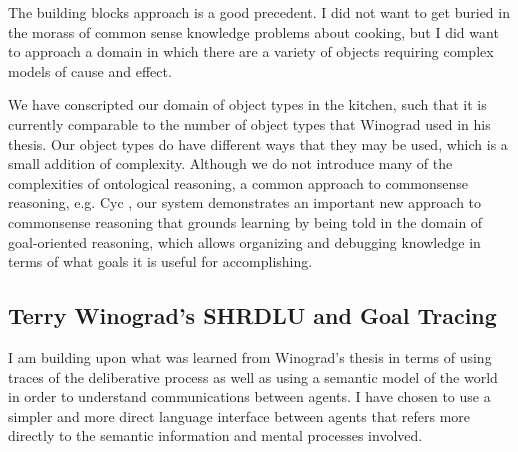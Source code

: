 The building blocks approach is a good precedent.  I did not want to
get buried in the morass of common sense knowledge problems about
cooking, but I did want to approach a domain in which there are a
variety of objects requiring complex models of cause and effect.

We have conscripted our domain of object types in the kitchen, such
that it is currently comparable to the number of object types that
Winograd used in his thesis.  Our object types do have different ways
that they may be used, which is a small addition of complexity.
Although we do not introduce many of the complexities of ontological
reasoning, a common approach to commonsense reasoning, e.g. Cyc
\citep{lenat:1990}, our system demonstrates an important new approach
to commonsense reasoning that grounds learning by being told in the
domain of goal-oriented reasoning, which allows organizing and
debugging knowledge in terms of what goals it is useful for
accomplishing.

\subsection{Terry Winograd's SHRDLU and Goal Tracing}

I am building upon what was learned from Winograd's thesis
\citep{winograd:1970} in terms of using traces of the deliberative
process as well as using a semantic model of the world in order to
understand communications between agents.  I have chosen to use a
simpler and more direct language interface between agents that refers
more directly to the semantic information and mental processes
involved.

